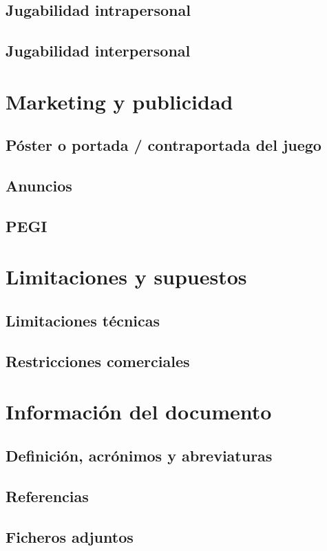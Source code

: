 \subsection{Jugabilidad intrapersonal}
\subsection{Jugabilidad interpersonal}

\section{Marketing y publicidad}
\subsection{Póster o portada / contraportada del juego}
\subsection{Anuncios}
\subsection{PEGI}


\section{Limitaciones y supuestos}
\subsection{Limitaciones técnicas}
\subsection{Restricciones comerciales}


\section{Información del documento}
\subsection{Definición, acrónimos y abreviaturas}
\subsection{Referencias}
\subsection{Ficheros adjuntos}

\chapterend

